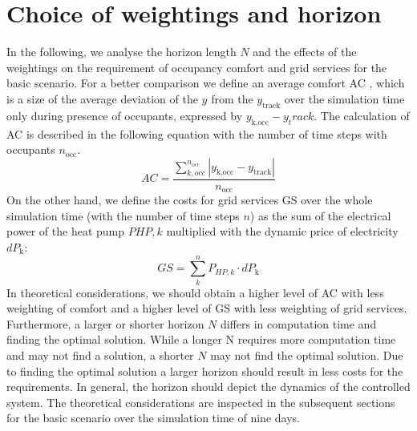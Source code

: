 \section{Choice of weightings and horizon}
\label{Choise of weigtings and horizon}
In the following, we analyse the horizon length $N$  and the effects of the weightings on the requirement of occupancy comfort and grid services for the basic scenario. For a better comparison we define an average comfort AC , which is a size of the average deviation of the $y$ from the $y_\text{track}$ over the simulation time only during presence of occupants, expressed by $y_\text{k,occ} - y_track$. The calculation of AC is described in the following equation with the number of time steps with occupants $n_\text{occ}$.
\begin{equation}
    \label{eq:average comfort}
    AC = \frac{\sum_{k,occ}^{n_\text{occ}} |y_\text{k,occ} - y_\text{track}|}{n_\text{occ}}
\end{equation}
On the other hand, we define the costs for grid services GS  over the whole simulation time (with the number of time steps $n$) as the sum of the electrical power of the heat pump $P{HP,k}$ multiplied with the dynamic price of electricity $dP_\text{k}$:
\begin{equation}
    GS = \sum_{k}^n P_{HP,k}\cdot dP_\text{k}
\end{equation}
In theoretical considerations, we should obtain a higher level of AC with less weighting of comfort and a higher level of GS with less weighting of grid services. Furthermore, a larger or shorter horizon $N$ differs in computation time and finding the optimal solution. While a longer N requires more computation time and may not find a solution, a shorter $N$ may not find the optimal solution. Due to finding the optimal solution a larger horizon should result in less costs for the requirements. In general, the horizon should depict the dynamics of the controlled system. \newline
The theoretical considerations are inspected in the subsequent sections for the basic scenario over the simulation time of nine days.   

